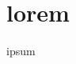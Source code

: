 \documentclass[twocolumn]{article}
\title{{\Huge \textbf{}} \\ }
\author{ \\ {\small }}
\date{}
\begin{document}
\section*{lorem}

ipsum
\end{document}
